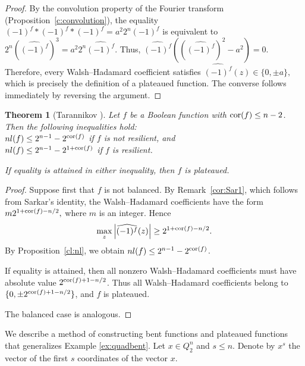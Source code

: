 \documentclass[11pt]{article}
\newtheorem{theorem}{Theorem}[section]
\theoremstyle{definition}
\newcommand{\cor}{{\rm cor}}
\begin{document}
{{{\begin{proof}
By the convolution property of the Fourier transform (Proposition~\ref{c:convolution}), the equality
$(-1)^f*(-1)^f*(-1)^f
=
a^2 2^n(-1)^f$
is equivalent to
$2^n\left(\widehat{(-1)^f}\right)^3
=
a^2 2^n\widehat{(-1)^f}$.
Thus,
$\widehat{(-1)^f}
\left(
\left(\widehat{(-1)^f}\right)^2-a^2
\right)
=0.$
Therefore, every Walsh--Hadamard coefficient satisfies
$
\widehat{(-1)^f}(z)
\in\{0,\pm a\},$
which is precisely the definition of a plateaued function. The converse follows immediately by reversing the argument.
\end{proof}

\begin{theorem}[Tarannikov \cite{Taran00}]\label{th:Tar}
Let $f$ be a Boolean function with $\cor(f)\leq n-2$. Then the following inequalities hold:\\
$nl(f)\leq 2^{n-1}-2^{\cor(f)}$ if $f$ is not resilient, and\\
$nl(f)\leq 2^{n-1}-2^{1+\cor(f)}$
if $f$ is resilient.

If equality is attained in either inequality, then $f$ is plateaued.
\end{theorem}

\begin{proof}
Suppose first that $f$ is not balanced. By Remark~\ref{cor:Sar1}, which follows from Sarkar's identity, the Walsh--Hadamard coefficients have the form
$m2^{1+\cor(f)-n/2},
$
where $m$ is an integer. Hence
\[
\max_z\left|\widehat{(-1)^f}(z)\right|
\geq 2^{1+\cor(f)-n/2}.
\]
By Proposition~\ref{cl:nl}, we obtain
$nl(f)
\leq
2^{n-1}-2^{\cor(f)}$.


If equality is attained, then all nonzero Walsh--Hadamard coefficients must have absolute value
$2^{\cor(f)+1-n/2}$.
Thus all Walsh--Hadamard coefficients belong to
$\{0,
\pm2^{\cor(f)+1-n/2}\}$,
and $f$ is plateaued.

The balanced case is analogous.
\end{proof}







We describe a method of constructing bent functions and plateaued functions
that generalizes Example \ref{ex:quadbent}.
Let $x\in Q^n_2$ and $s\leq n$. Denote by $x^s$ the vector of the
first $s$ coordinates of the vector $x$.

}}}
\end{document}
